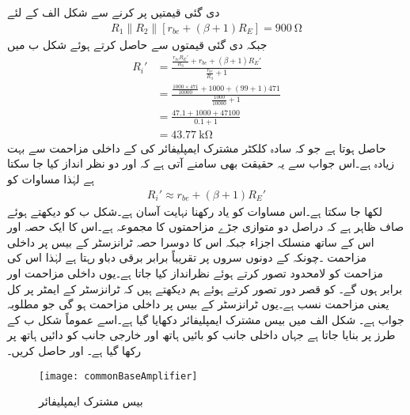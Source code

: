 دی گئی قیمتیں پر کرنے سے شکل  الف  کے لئے
\begin{align*}
R_1 \mathbin{\|} R_2 \mathbin{\|} \left[r_{be}+\left(\beta+1 \right) R_E\right] =\SI{900}{\ohm}
\end{align*}
جبکہ دی گئی قیمتوں سے  حاصل کرتے ہوئے شکل  ب میں 
\begin{align*}
R_i'&=\frac{\frac{r_{be} R_E'}{R_3} +r_{be}+\left(\beta+1\right)R_E' }{\frac{r_{be}}{R_3}+1}\\
&=\frac{\frac{1000\times 471}{10000} +1000+\left(99+1\right)471 }{\frac{1000}{10000}+1}\\
&=\frac{47.1 +1000+47100 }{0.1+1}\\
&=\SI{43.77}{\kilo \ohm}
\end{align*}
حاصل ہوتا ہے جو کہ سادہ کلکٹر  مشترک ایمپلیفائر کی  کے داخلی مزاحمت سے بہت زیادہ ہے۔اس جواب سے یہ حقیقت بھی سامنے آتی ہے کہ  اور  دو نظر انداز کیا جا سکتا ہے لہٰذا مساوات  کو
\begin{align}\label{مساوات_ٹرانزسٹر_کلکٹر _مشترک_زیادہ_داخلی_مزاحمت_الف}
R_i' \approx  r_{be}+\left(\beta+1\right)R_E' 
\end{align}
لکھا جا سکتا ہے۔اس مساوات کو یاد رکھنا نہایت آسان ہے۔شکل  ب کو دیکھتے ہوئے صاف ظاہر ہے کہ  دراصل دو متوازی جڑے مزاحمتوں کا مجموعہ ہے۔اس کا ایک حصہ  اور اس کے ساتھ منسلک اجزاء جبکہ اس کا دوسرا حصہ ٹرانزسٹر کے بیس پر داخلی مزاحمت ۔چونکہ  کے دونوں سروں پر تقریباً برابر برقی دباو رہتا ہے لہٰذا اس کی مزاحمت کو لامحدود تصور کرتے ہوئے نظرانداز کیا جاتا ہے۔یوں داخلی مزاحمت  اور  برابر ہوں گے۔ کو قصر دور تصور کرتے ہوئے ہم دیکھتے ہیں کہ ٹرانزسٹر کے ایمٹر پر کل
  یعنی  مزاحمت نسب ہے۔یوں ٹرانزسٹر کے بیس پر داخلی مزاحمت
  ہو گی جو مطلوبہ جواب ہے۔
شکل  الف میں بیس مشترک ایمپلیفائر دکھایا گیا ہے۔اسے عموماً شکل  ب کے طرز پر بنایا جاتا ہے جہاں داخلی جانب کو بائیں ہاتھ اور خارجی جانب کو دائیں ہاتھ پر رکھا گیا ہے۔ اور  حاصل کریں۔ 
\begin{figure}
\centering
\texttt{[image: commonBaseAmplifier]}
\caption{بیس مشترک ایمپلیفائر}
\label{شکل_ٹرانزسٹر_قابو_مشترک_ایمپلیفائر}
\end{figure}

